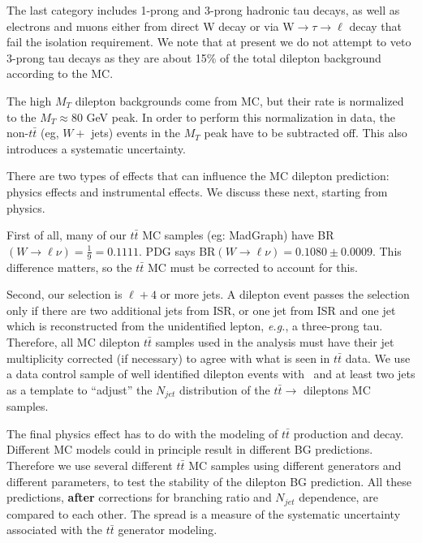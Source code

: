 The last category includes 1-prong and 3-prong hadronic tau decays, as well as electrons and muons either from direct W decay or via W$\to\tau\to\ell$ decay 
that fail the isolation requirement.
We note that at present we do not attempt to veto 3-prong tau decays as they are about 15\% of the total dilepton background according to the MC.

The high $M_T$ dilepton backgrounds come from MC, but their rate is normalized to the 
$M_T \approx 80$ GeV peak.  In order to perform this normalization in
data, the non-$t\bar{t}$ (eg, $W +$ jets)
events in the $M_T$ peak have to be subtracted off.  This also introduces a systematic uncertainty.

There are two types of effects that can influence the MC dilepton prediction: physics effects 
and instrumental effects.  We discuss these next, starting from physics.

First of all, many of our $t\bar{t}$ MC samples (eg: MadGraph) have
 BR$(W \to \ell \nu)=\frac{1}{9} = 0.1111$.
PDG says BR$(W \to \ell \nu) = 0.1080 \pm 0.0009$.  This difference matters, so the $t\bar{t}$ MC 
must be corrected to account for this.

Second, our selection is $\ell +4$ or more jets.  A dilepton event passes the selection only if there are 
two additional jets from ISR, or one jet from ISR and one jet which is reconstructed from the 
unidentified lepton, {\it e.g.}, a three-prong tau.  Therefore, all MC dilepton $t\bar{t}$ samples used
in the analysis must have their jet multiplicity corrected (if necessary) to agree with what is 
seen in $t\bar{t}$ data.  We use a data control sample of well identified dilepton events with
\met\ and at least two jets as a template to ``adjust'' the $N_{jet}$ distribution of the $t\bar{t} \to$
dileptons MC samples.

The final physics effect has to do with the modeling of $t\bar{t}$ production and decay.  Different
MC models could in principle result in different BG predictions.  Therefore we use several different 
$t\bar{t}$ MC samples using different generators and different parameters, to test the stability
of the dilepton BG prediction.  All these predictions, {\bf after} corrections for branching ratio
and $N_{jet}$ dependence, are compared to each other.  The spread is a measure of the systematic
uncertainty associated with the $t\bar{t}$ generator modeling.

